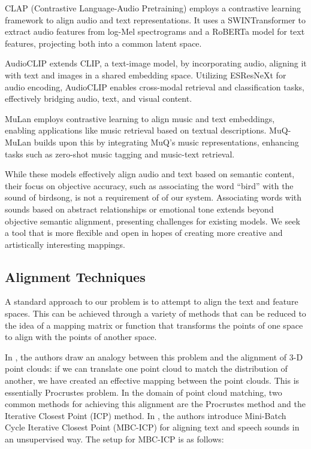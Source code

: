 \documentclass[twoside,a4paper]{article}
\begin{document}
CLAP (Contrastive Language-Audio Pretraining) employs a contrastive learning framework to align audio and text representations. It uses a SWINTransformer to extract audio features from log-Mel spectrograms and a RoBERTa model for text features, projecting both into a common latent space. 

AudioCLIP extends CLIP, a text-image model, by incorporating audio, aligning it with text and images in a shared embedding space. Utilizing ESResNeXt for audio encoding, AudioCLIP enables cross-modal retrieval and classification tasks, effectively bridging audio, text, and visual content.

MuLan employs contrastive learning to align music and text embeddings, enabling applications like music retrieval based on textual descriptions. MuQ-MuLan builds upon this by integrating MuQ's music representations, enhancing tasks such as zero-shot music tagging and music-text retrieval. 

While these models effectively align audio and text based on semantic content, their focus on objective accuracy, such as associating the word ``bird'' with the sound of birdsong, is not a requirement of of our system. Associating words with sounds based on abstract relationships or emotional tone extends beyond objective semantic alignment, presenting challenges for existing models. We seek a tool that is more flexible and open in hopes of creating more creative and artistically interesting mappings. 

\subsection{Alignment Techniques}
A standard approach to our problem is to attempt to align the text and feature spaces. This can be achieved through a variety of methods that can be reduced to the idea of a mapping matrix or function that transforms the points of one space to align with the points of another space. 

In \cite{Hoshen:18}, the authors draw an analogy between this problem and the alignment of 3-D point clouds: if we can translate one point cloud to match the distribution of another, we have created an effective mapping between the point clouds. This is essentially Procrustes problem. In the domain of point cloud matching, two common methods for achieving this alignment are the Procrustes method and the Iterative Closest Point (ICP) method. In \cite{Hoshen:18}, the authors introduce Mini-Batch Cycle Iterative Closest Point (MBC-ICP) for aligning text and speech sounds in an unsupervised way. The setup for MBC-ICP is as follows:
\end{document}
